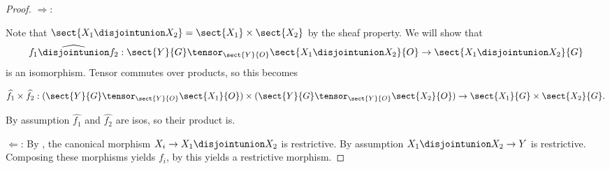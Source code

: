 
\begin{proof}
$\Rightarrow$:

Note that $\sect{X_1 \disjointunion X_2} = \sect{X_1} \times \sect{X_2}$ by the sheaf property.
We will show that
\[
\widehat{f_1\disjointunion f_2}:\sect{Y}{G} \tensor_{\sect{Y}{O}} \sect{X_1 \disjointunion X_2}{O} \rightarrow \sect{X_1 \disjointunion X_2}{G}
\]
is an isomorphism. 
Tensor commutes over products, so this becomes

\[
\widehat{f_1} \times \widehat{f_2}:(\sect{Y}{G} \tensor_{\sect{Y}{O}} \sect{X_1}{O}) 
\times (\sect{Y}{G} \tensor_{\sect{Y}{O}} \sect{X_2}{O}) 
\rightarrow \sect{X_1}{G} \times \sect{X_2}{G}.
\]

By assumption $\widehat{f_1}$ and $\widehat{f_2}$ are isos, so their product is.

$\Leftarrow$:
By , the canonical morphism $X_i \rightarrow X_1 \disjointunion X_2$ is restrictive.
By assumption $X_1 \disjointunion X_2 \rightarrow Y$ is restrictive.
Composing these morphisms yields $f_i$, by  this yields a restrictive morphism.
\end{proof}